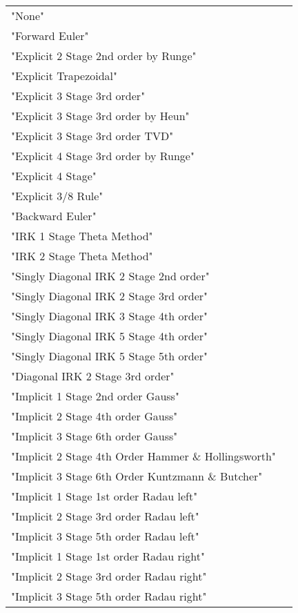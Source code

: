\begin{list}{}
\begin{description}
      \begin{tabular}{lp{}}
      "None" & \\ 
      "Forward Euler" & \\ 
      "Explicit 2 Stage 2nd order by Runge" & \\ 
      "Explicit Trapezoidal" & \\ 
      "Explicit 3 Stage 3rd order" & \\ 
      "Explicit 3 Stage 3rd order by Heun" & \\ 
      "Explicit 3 Stage 3rd order TVD" & \\ 
      "Explicit 4 Stage 3rd order by Runge" & \\ 
      "Explicit 4 Stage" & \\ 
      "Explicit 3/8 Rule" & \\ 
      "Backward Euler" & \\ 
      "IRK 1 Stage Theta Method" & \\ 
      "IRK 2 Stage Theta Method" & \\ 
      "Singly Diagonal IRK 2 Stage 2nd order" & \\ 
      "Singly Diagonal IRK 2 Stage 3rd order" & \\ 
      "Singly Diagonal IRK 3 Stage 4th order" & \\ 
      "Singly Diagonal IRK 5 Stage 4th order" & \\ 
      "Singly Diagonal IRK 5 Stage 5th order" & \\ 
      "Diagonal IRK 2 Stage 3rd order" & \\ 
      "Implicit 1 Stage 2nd order Gauss" & \\ 
      "Implicit 2 Stage 4th order Gauss" & \\ 
      "Implicit 3 Stage 6th order Gauss" & \\ 
      "Implicit 2 Stage 4th Order Hammer \& Hollingsworth" & \\ 
      "Implicit 3 Stage 6th Order Kuntzmann \& Butcher" & \\ 
      "Implicit 1 Stage 1st order Radau left" & \\ 
      "Implicit 2 Stage 3rd order Radau left" & \\ 
      "Implicit 3 Stage 5th order Radau left" & \\ 
      "Implicit 1 Stage 1st order Radau right" & \\ 
      "Implicit 2 Stage 3rd order Radau right" & \\ 
      "Implicit 3 Stage 5th order Radau right" & \\ 

\end{tabular}
\end{description}
\end{list}

